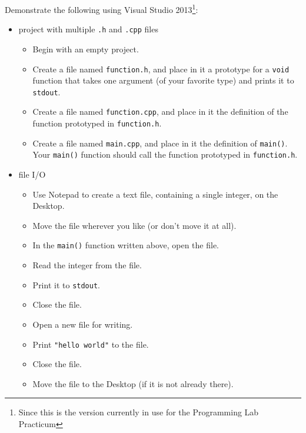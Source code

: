 Demonstrate the following using Visual Studio 2013\footnote{Since this is the
version currently in use for the Programming Lab Practicum}:
\begin{itemize}
  \item project with multiple \texttt{.h} and \texttt{.cpp}
    files
    \begin{itemize}
      \item Begin with an empty project.
      \item Create a file named \texttt{function.h}, and place in it a
        prototype for a \texttt{void} function that takes one argument
        (of your favorite type) and prints it to \texttt{stdout}.
      \item Create a file named \texttt{function.cpp}, and place in it
        the definition of the function prototyped in
        \texttt{function.h}.
      \item Create a file named \texttt{main.cpp}, and place in it the
        definition of \texttt{main()}.  Your \texttt{main()}
        function should call the function prototyped in
        \texttt{function.h}.
    \end{itemize}
  \item file I/O
    \begin{itemize}
      \item Use Notepad to create a text file, containing a single integer,
        on the Desktop.
      \item Move the file wherever you like (or don't move it at all).
      \item In the \texttt{main()} function written above, open the
        file.
      \item Read the integer from the file.
      \item Print it to \texttt{stdout}.
      \item Close the file.
      \item Open a new file for writing.
      \item Print \texttt{"hello world\n"} to the file.
      \item Close the file.
      \item Move the file to the Desktop (if it is not already there).
    \end{itemize}
\end{itemize}



